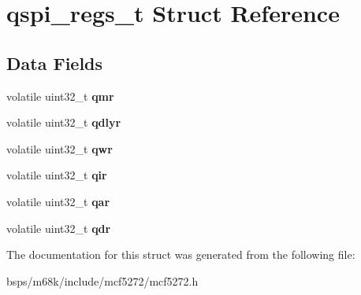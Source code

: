\hypertarget{structqspi__regs__t}{}\section{qspi\+\_\+regs\+\_\+t Struct Reference}
\label{structqspi__regs__t}
\subsection*{Data Fields}
\begin{DoxyCompactItemize}
\item 
\mbox{\label{structqspi__regs__t_a601a67f398817611a4912a11ff9be044}} 
volatile uint32\+\_\+t {\bfseries qmr}
\item 
\mbox{\label{structqspi__regs__t_a1ff5cfe7c7780b5e9b2779dc3b5ba15e}} 
volatile uint32\+\_\+t {\bfseries qdlyr}
\item 
\mbox{\label{structqspi__regs__t_a88fefac65de9a6fab4bde20608b2fa0e}} 
volatile uint32\+\_\+t {\bfseries qwr}
\item 
\mbox{\label{structqspi__regs__t_a158b680f7261a71886ae5e9f0df927ca}} 
volatile uint32\+\_\+t {\bfseries qir}
\item 
\mbox{\label{structqspi__regs__t_ab01b7c9dc681e3a6595667da42406de4}} 
volatile uint32\+\_\+t {\bfseries qar}
\item 
\mbox{\label{structqspi__regs__t_a7d435d0f8ddeb85bd163eec807592dee}} 
volatile uint32\+\_\+t {\bfseries qdr}
\end{DoxyCompactItemize}


The documentation for this struct was generated from the following file\+:\begin{DoxyCompactItemize}
\item 
bsps/m68k/include/mcf5272/mcf5272.\+h\end{DoxyCompactItemize}
